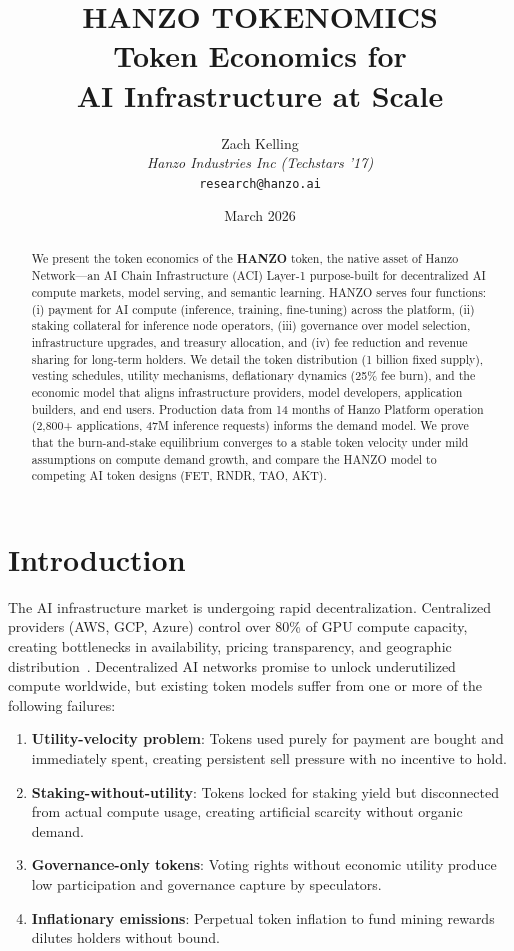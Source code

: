 \documentclass[11pt]{article}
\title{HANZO TOKENOMICS\\[0.3em]
{\large Token Economics for\\AI Infrastructure at Scale}}
\author{
    Zach Kelling \\
    \textit{Hanzo Industries Inc (Techstars '17)} \\
    \texttt{research@hanzo.ai}
}
\date{March 2026}
\begin{document}
\luxcoverpage

\begin{abstract}
We present the token economics of the \textbf{HANZO} token, the native asset of
Hanzo Network---an AI Chain Infrastructure (ACI) Layer-1 purpose-built for
decentralized AI compute markets, model serving, and semantic learning. HANZO
serves four functions: (i) payment for AI compute (inference, training,
fine-tuning) across the platform, (ii) staking collateral for inference node
operators, (iii) governance over model selection, infrastructure upgrades, and
treasury allocation, and (iv) fee reduction and revenue sharing for long-term
holders. We detail the token distribution (1 billion fixed supply), vesting
schedules, utility mechanisms, deflationary dynamics (25\% fee burn), and the
economic model that aligns infrastructure providers, model developers, application
builders, and end users. Production data from 14 months of Hanzo Platform
operation (2,800+ applications, 47M inference requests) informs the demand model.
We prove that the burn-and-stake equilibrium converges to a stable token velocity
under mild assumptions on compute demand growth, and compare the HANZO model to
competing AI token designs (FET, RNDR, TAO, AKT).
\end{abstract}

\section{Introduction}
\label{sec:intro}

The AI infrastructure market is undergoing rapid decentralization. Centralized
providers (AWS, GCP, Azure) control over 80\% of GPU compute capacity, creating
bottlenecks in availability, pricing transparency, and geographic
distribution~\cite{mckinseyai2024}. Decentralized AI networks promise to unlock
underutilized compute worldwide, but existing token models suffer from one or more
of the following failures:

\begin{enumerate}[leftmargin=1.4em]
    \item \textbf{Utility-velocity problem}: Tokens used purely for payment are
    bought and immediately spent, creating persistent sell pressure with no
    incentive to hold.
    \item \textbf{Staking-without-utility}: Tokens locked for staking yield but
    disconnected from actual compute usage, creating artificial scarcity without
    organic demand.
    \item \textbf{Governance-only tokens}: Voting rights without economic utility
    produce low participation and governance capture by speculators.
    \item \textbf{Inflationary emissions}: Perpetual token inflation to fund
    mining rewards dilutes holders without bound.
\end{enumerate}
\end{document}
